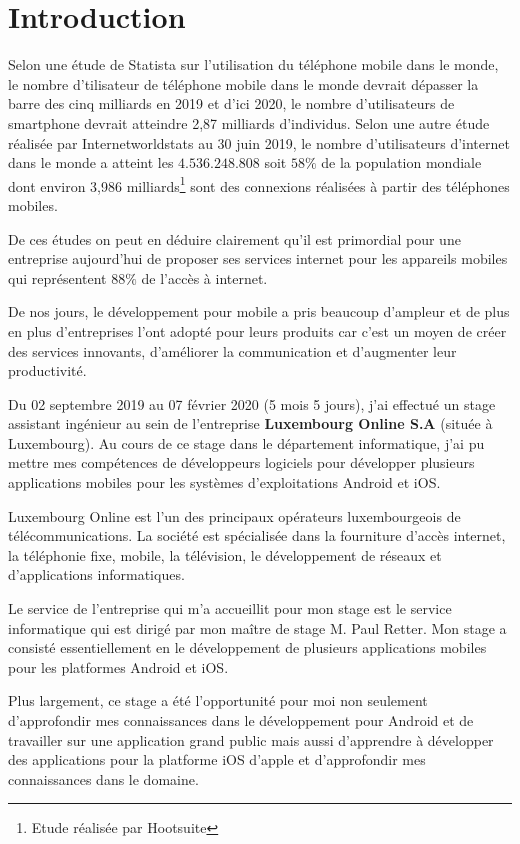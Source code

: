 \documentclass[report, backcover, french]{upmethodology-document}
\begin{document}
\chapter*{Introduction}
Selon une étude de Statista sur l'utilisation du téléphone mobile dans le monde, le nombre d'tilisateur de téléphone mobile dans le monde devrait dépasser la barre des cinq milliards en 2019 et d'ici 2020, le nombre d'utilisateurs de smartphone devrait atteindre 2,87 milliards d'individus. Selon une autre étude réalisée par \og Internetworldstats \fg{,}  au 30 juin 2019, le nombre d'utilisateurs d'internet dans le monde a atteint les $4.536.248.808$ soit $58 \% $ de la population mondiale dont environ 3,986 milliards\footnote{Etude réalisée par Hootsuite} sont des connexions réalisées à partir des téléphones mobiles.

De ces études on peut en déduire clairement qu'il est primordial pour une entreprise aujourd'hui de proposer ses services internet pour les appareils mobiles  qui  représentent $88\% $ de l'accès à internet. 

De nos jours, le développement pour mobile a pris beaucoup d'ampleur  et de plus en plus d'entreprises l'ont adopté pour leurs produits car c'est un moyen de créer des services innovants, d'améliorer la communication et d'augmenter leur productivité.

Du 02 septembre 2019 au 07 février 2020 (5 mois 5 jours), j'ai effectué un stage assistant ingénieur au sein de l'entreprise \textbf{Luxembourg Online S.A} (située à Luxembourg). Au cours de ce stage dans le département informatique, j'ai pu mettre mes compétences de développeurs logiciels pour développer plusieurs applications mobiles pour les systèmes d'exploitations Android et iOS.

Luxembourg Online est l'un des principaux opérateurs luxembourgeois de télécommunications. La société est spécialisée dans la fourniture d'accès internet, la téléphonie fixe, mobile, la télévision, le développement de réseaux et d'applications informatiques.

Le service de l'entreprise qui m'a accueillit pour mon stage est le service informatique qui est dirigé par mon maître de stage M. Paul Retter. Mon stage a consisté essentiellement en le développement de plusieurs applications mobiles pour les platformes Android et iOS.

Plus largement, ce stage a été l'opportunité pour moi non seulement d'approfondir mes connaissances dans le développement pour Android et de travailler sur une application grand public mais aussi d'apprendre à développer des applications pour la platforme iOS d'apple et d'approfondir mes connaissances dans le domaine.
\end{document}
